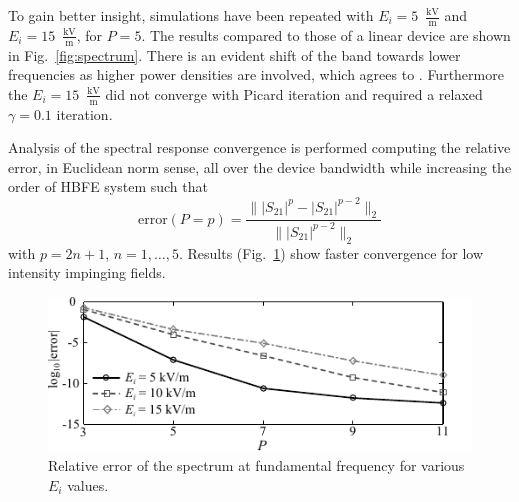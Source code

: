 To gain better insight, simulations have
been repeated with $E_i=5$~${\frac{\mathrm{kV}}{\mathrm{m}}}$ and $E_i=15$~${\frac{\mathrm{kV}}{\mathrm{m}}}$, for $P=5$. 
The results compared to those of a linear device are shown in Fig.~\ref{fig:spectrum}. 
There is an evident shift of the band 
towards lower frequencies as higher power densities are involved, which agrees 
to \cite{Yatsyk2006}. Furthermore the $E_i=15$~${\frac{\mathrm{kV}}{\mathrm{m}}}$ did not 
converge with Picard iteration and required a relaxed $\gamma = 0.1$ iteration.

Analysis of the spectral response convergence is performed computing the relative
error, in Euclidean norm sense, all over the device bandwidth while increasing 
the order of HBFE system such that
\begin{equation} \label{eq:convError}
	\mathrm{error}(P=p) = \frac{\| |S_{21}|^{p} - |S_{21}|^{p-2}\|_2}
	{\| |S_{21}|^{p-2}\|_2} 
\end{equation}
\noindent with $p = 2n+1$, $n=1,\ldots,5$. Results (Fig.~\ref{fig:convergence})
show faster convergence for low intensity impinging fields.

\begin{figure}[!ht]
\centering
\includegraphics[width=12cm]{convergence}
\caption{
Relative error of the spectrum at fundamental frequency for various $E_i$ values.}
\label{fig:convergence}
\end{figure}

